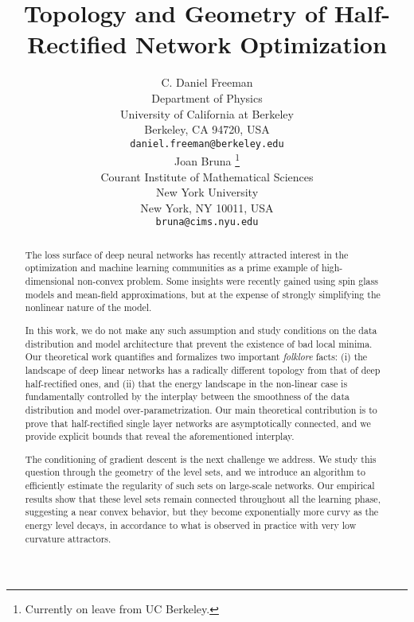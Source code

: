 \documentclass{article} %
\title{Topology and Geometry of Half-Rectified Network Optimization }
\author{C. Daniel Freeman  \\
Department of Physics\\
University of California at Berkeley\\
Berkeley, CA 94720, USA \\
\texttt{daniel.freeman@berkeley.edu} \\
\And
Joan Bruna \thanks{Currently on leave from UC Berkeley.} \\
Courant Institute of Mathematical Sciences  \\
New York University \\
New York, NY 10011, USA \\
\texttt{bruna@cims.nyu.edu} \\
}
\begin{document}
\maketitle

\begin{abstract}
The loss surface of deep neural networks has recently attracted interest 
in the optimization and machine learning communities as a prime example of 
high-dimensional non-convex problem. Some insights were recently gained using spin glass 
models and mean-field approximations, but at the expense of strongly simplifying the nonlinear nature of the model.

In this work, we do not make any such assumption and study conditions 
on the data distribution and model architecture that prevent the existence 
of bad local minima. Our theoretical work quantifies and formalizes two 
important \emph{folklore} facts: (i) the landscape of deep linear networks has a radically different topology 
from that of deep half-rectified ones, and (ii) that the energy landscape 
in the non-linear case is fundamentally controlled by the interplay between the smoothness of the data distribution and model over-parametrization. Our main theoretical contribution is to prove that half-rectified single layer networks are asymptotically connected, and we provide explicit bounds that reveal the aforementioned interplay.

The conditioning of gradient descent is the next challenge we address. 
We study this question through the geometry of the level sets, and we introduce
an algorithm to efficiently estimate the regularity of such sets on large-scale networks. 
Our empirical results show that these level sets remain connected throughout 
all the learning phase, suggesting a near convex behavior, but they become 
exponentially more curvy as the energy level decays, in accordance to what is observed in practice with 
very low curvature attractors.
\end{abstract}









  
\end{document}
